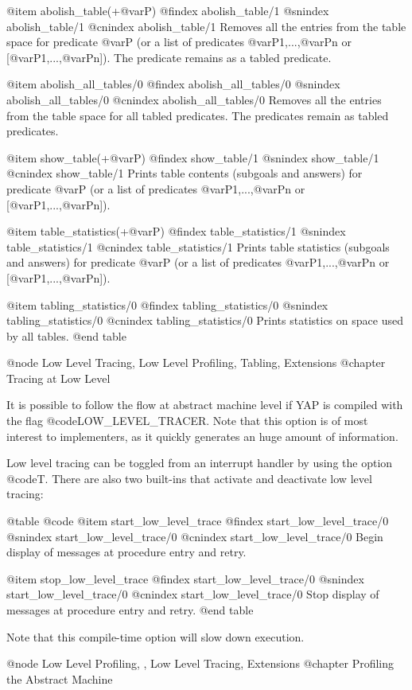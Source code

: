 {{{{{{{{{@item abolish_table(+@var{P})
@findex abolish_table/1
@snindex abolish_table/1
@cnindex abolish_table/1
Removes all the entries from the table space for predicate @var{P} (or
a list of predicates @var{P1},...,@var{Pn} or
[@var{P1},...,@var{Pn}]). The predicate remains as a tabled predicate.

@item abolish_all_tables/0
@findex abolish_all_tables/0
@snindex abolish_all_tables/0
@cnindex abolish_all_tables/0
Removes all the entries from the table space for all tabled
predicates. The predicates remain as tabled predicates.

@item show_table(+@var{P})
@findex show_table/1
@snindex show_table/1
@cnindex show_table/1
Prints table contents (subgoals and answers) for predicate @var{P}
(or a list of predicates @var{P1},...,@var{Pn} or
[@var{P1},...,@var{Pn}]).

@item table_statistics(+@var{P})
@findex table_statistics/1
@snindex table_statistics/1
@cnindex table_statistics/1
Prints table statistics (subgoals and answers) for predicate @var{P}
(or a list of predicates @var{P1},...,@var{Pn} or
[@var{P1},...,@var{Pn}]).

@item tabling_statistics/0
@findex tabling_statistics/0
@snindex tabling_statistics/0
@cnindex tabling_statistics/0
Prints statistics on space used by all tables.
@end table


@node Low Level Tracing, Low Level Profiling, Tabling, Extensions
@chapter Tracing at Low Level

It is possible to follow the flow at abstract machine level if
YAP is compiled with the flag @code{LOW_LEVEL_TRACER}. Note
that this option is of most interest to implementers, as it quickly generates
an huge amount of information.

Low level tracing can be toggled from an interrupt handler by using the
option @code{T}. There are also two built-ins that activate and
deactivate low level tracing:

@table @code
@item start_low_level_trace
@findex start_low_level_trace/0
@snindex start_low_level_trace/0
@cnindex start_low_level_trace/0
Begin display of messages at procedure entry and retry.

@item stop_low_level_trace
@findex start_low_level_trace/0
@snindex start_low_level_trace/0
@cnindex start_low_level_trace/0
Stop display of messages at procedure entry and retry.
@end table

Note that this compile-time option will slow down execution.

@node Low Level Profiling, , Low Level Tracing, Extensions
@chapter Profiling the Abstract Machine

}}}}}}}}}
